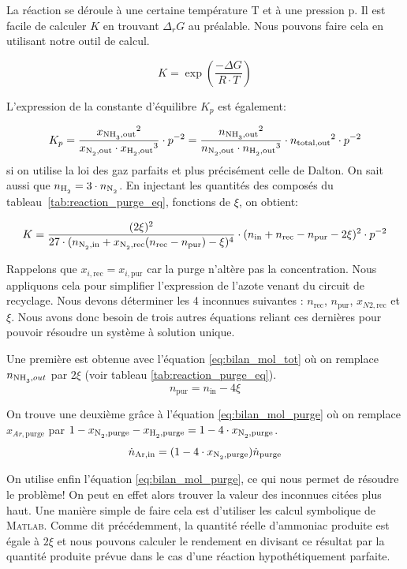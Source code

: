 La réaction se déroule à une certaine température T et à une pression p. 
Il est facile de calculer $K$ en trouvant $\Delta_r G$ au préalable. 
Nous pouvons faire cela en utilisant notre outil de calcul.

\[
K=\exp{\left(\frac{-\Delta G}{R \cdot T}\right)}
\]

L'expression de la constante d'équilibre $K_p$ est également: 

\[
K_p=\frac{{x_{\ce{NH3},\text{out}}}^2}{x_{\ce{N2},\text{out}} \cdot
	{x_{\ce{H2},\text{out}}}^3} \cdot p^{-2} = 
	\frac{{n_{\ce{NH3},\text{out}}}^2}{n_{\ce{N2},\text{out}} \cdot 
	{n_{\ce{H2},\text{out}}}^3}\cdot {n_{\text{total,out}}}^2\cdot p^{-2}
\]
si on utilise la loi des gaz parfaits et plus précisément celle de Dalton. 
On sait aussi que $n_{\ce{H2}}=3\cdot n_{\ce{N2}}$.
En injectant les quantités des composés du tableau~\ref{tab:reaction_purge_eq},
fonctions de $\xi$, on obtient:

\[ 
K = 
\frac{({2\xi})^2}{27 \cdot ({{n_{\ce{N2},\text{in}}}+x_{\ce{N2},\text{rec}}
(n_{\text{rec}}-n_{\text{pur}})-\xi})^4} \cdot
	({n_{\text{in}}+n_{\text{rec}}-n_{\text{pur}}-2\xi})^2 \cdot p^{-2} 
\]

Rappelons que $x_{i,\text{rec}}=x_{i,\text{pur}}$ car la purge n'altère pas la concentration.
Nous appliquons cela pour simplifier l'expression de l'azote venant du circuit
de recyclage.
Nous devons déterminer les 4 inconnues suivantes : $n_{\text{rec}}$, $n_{\text{pur}}$, 
$x_{N2,\text{rec}}$ et $\xi$.
Nous avons donc besoin de trois autres équations reliant ces dernières pour pouvoir 
résoudre un système à solution unique.

Une première est obtenue avec l'équation \ref{eq:bilan_mol_tot} où on remplace $n_{\ce{NH3},out}$ par
$2 \xi$ (voir tableau \ref{tab:reaction_purge_eq}).
\[n_{\text{pur}}=n_{\text{in}} - 4 \xi \]

On trouve une deuxième grâce à l'équation \ref{eq:bilan_mol_purge} 
où on remplace $x_{Ar,\text{purge}}$ 
par $1-x_{\ce{N2},\text{purge}}-x_{\ce{H2},\text{purge}}=1-4\cdot x_{\ce{N2},\text{purge}}$.
\[ \dot{n}_{\ce{Ar},\text{in}}=(1-4\cdot x_{\ce{N2},\text{purge}}) \dot{n}_{\text{purge}} \]

On utilise enfin l'équation \ref{eq:bilan_mol_purge}, 
ce qui nous permet de résoudre le problème! On peut en effet alors
trouver la valeur des inconnues citées plus haut.
Une manière simple de faire cela est d'utiliser les calcul symbolique de \textsc{Matlab}. 
Comme dit précédemment, la quantité réelle d'ammoniac produite est égale à $2 \xi$ 
et nous pouvons calculer le rendement en divisant ce résultat
par la quantité produite prévue dans le cas d'une réaction hypothétiquement parfaite.

